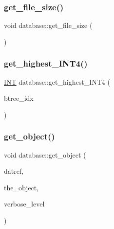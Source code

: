 \mbox{\label{classdatabase_a3f59b9585dfaa4c0f45c00388a128aaf}} 
\subsubsection{\texorpdfstring{get\+\_\+file\+\_\+size()}{get\_file\_size()}}
{\footnotesize\ttfamily void database\+::get\+\_\+file\+\_\+size (\begin{DoxyParamCaption}{ }\end{DoxyParamCaption})}

\mbox{\label{classdatabase_ad4d0dbaf8f34ee6aa357f46b5454986d}} 
\subsubsection{\texorpdfstring{get\+\_\+highest\+\_\+\+I\+N\+T4()}{get\_highest\_INT4()}}
{\footnotesize\ttfamily \mbox{\hyperlink{galois_8h_a09fddde158a3a20bd2dcadb609de11dc}{I\+NT}} database\+::get\+\_\+highest\+\_\+\+I\+N\+T4 (\begin{DoxyParamCaption}\item[{\mbox{\hyperlink{galois_8h_a09fddde158a3a20bd2dcadb609de11dc}{I\+NT}}}]{btree\+\_\+idx }\end{DoxyParamCaption})}

\mbox{\label{classdatabase_a2f58ec1301addabc2fb6544038e108c6}} 
\subsubsection{\texorpdfstring{get\+\_\+object()}{get\_object()}\hspace{0.1cm}{\footnotesize\ttfamily [1/2]}}
{\footnotesize\ttfamily void database\+::get\+\_\+object (\begin{DoxyParamCaption}\item[{\mbox{\hyperlink{galois_8h_ac94af6544c710549c9fca744fd510395}{U\+I\+N\+T4}}}]{datref,  }\item[{\mbox{\hyperlink{class_vector}{Vector}} \&}]{the\+\_\+object,  }\item[{\mbox{\hyperlink{galois_8h_a09fddde158a3a20bd2dcadb609de11dc}{I\+NT}}}]{verbose\+\_\+level }\end{DoxyParamCaption})}

